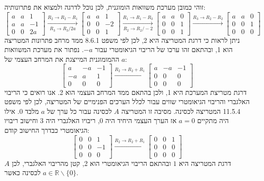 \documentclass[a4paper,10pt]{article}
\def\RR{\mathbb{R}}
\begin{document}
זוהי כמובן מערכת משוואות הומוגנית, לכן נוכל לדרגה ולמצוא את פתרונותיה:
\[
	\begin{bmatrix}
		a & a & 1 \\
		a & a & -1 \\
		0 & 0 & 2a
	\end{bmatrix}
	\xrightarrow[R_3 \rightarrow R_3 / 2a]{R_2 \rightarrow R_2 - R_1}
	\begin{bmatrix}
		a & a & 1 \\
		0 & 0 & -2 \\
		0 & 0 & 1
	\end{bmatrix}
	\xrightarrow[R_2 \rightarrow R_2 / -2]{R_1 \rightarrow R_1 - R_3}
	\begin{bmatrix}
		a & a & 0 \\
		0 & 0 & 1 \\
		0 & 0 & 1
	\end{bmatrix}
	\xrightarrow{R_3 \rightarrow R_2 - R_2}
	\begin{bmatrix}
		a & a & 0 \\
		0 & 0 & 1 \\
		0 & 0 & 0
	\end{bmatrix}
	\tag{2}
\]
ניתן לראות כי דרגת המטריצה היא 2,
לכן לפי משפט 8.6.1 ממד מרחב פתרונות המטריצה הוא 1,
ובהתאם זהו ערכו של הריבוי הגיאומטרי עבור $-a$.
נפתור את מערכת המשוואות ההמומוגנית המייצגת את המרחב העצמי של $a$:
\[
	\begin{bmatrix}
		a & -a & -1 \\
		-a & a & 1 \\
		0 & 0 & 0
	\end{bmatrix}
	\xrightarrow{R_2 \rightarrow R_2 + R_1}
	\begin{bmatrix}
		a & -a & -1 \\
		0 & 0 & 0 \\
		0 & 0 & 0
	\end{bmatrix} \tag{1}
\]
דרגת מטריצת המערכת היא 1, ולכן בהתאם ממד המרחב העצמי הוא 2.
אנו רואים כי הריבוי האלגברי והריבוי הגיאומטרי שווים עבור לכלל הערכים
הפנימיים של המטריצה, לכן לפי משפט 11.5.4 המטריצה לכסינה.
מסיבה זו המטריצה $A$ לכסינה עבור כל ערך של $a$ מלבד 0.
אילו היה מתקיים $a = 0$ אז הערך העצמי היחיד היה $0$, ריבויו האלגברי היה $3$ וחישוב ריבויו הגיאומטרי כבדרך החישוב קודם:
\[
	\begin{bmatrix}
		0 & 0 & 1 \\
		0 & 0 & -1 \\
		0 & 0 & 0
	\end{bmatrix}
	\xrightarrow{R_2 \to R_2 + R_1}
	\begin{bmatrix}
		0 & 0 & 1 \\
		0 & 0 & 0 \\
		0 & 0 & 0
	\end{bmatrix}
\]
דרגת המטריצה היא $1$ ובהתאם הריבוי הגיאומטרי הוא 2, קטן מהריבוי האלגברי, לכן $A$ לכסינה כאשר $a \in \RR\backslash\{0\}$.
\end{document}
